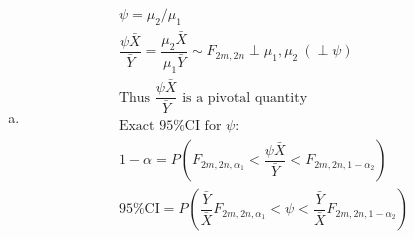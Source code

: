 \documentclass{article}
\newcommand{\al}{\alpha}
\newcommand{\Bx}{\bar{X}}
\newcommand{\By}{\bar{Y}}
\begin{document}
\begin{flushleft}
\begin{enumerate}[(a)]
	\item 
\begin{multline*}\\
\psi=\mu_2/\mu_1\\
\dfrac{\psi \Bx}{\By}=\dfrac{\mu_2 \Bx}{\mu_1\By}\sim F_{2m,2n}\perp \mu_1,\mu_2 \ (\perp \psi)\\
\text{Thus } \dfrac{\psi \Bx}{\By} \text{ is a pivotal quantity}\\
\text{Exact 95\% CI for } \psi:\\
1-\al=P(F_{2m,2n,\al_1}<\dfrac{\psi \Bx}{\By}<F_{2m,2n,1-\al_2})\\
\text{95\% CI}=P(\dfrac{\By}{\Bx}F_{2m,2n,\al_1}<\psi<\dfrac{\By}{\Bx}F_{2m,2n,1-\al_2})\\
\end{multline*}

\end{enumerate}

\end{flushleft}
\end{document}
